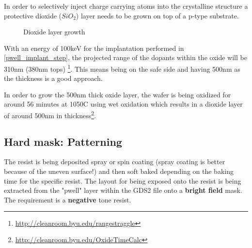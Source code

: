 In order to selectively inject charge carrying atoms into the crystalline structure a protective dioxide ($SiO_2$) layer needs to be grown on top of a p-type substrate.

\begin{figure}[H]
	\centering
	\begin{tikzpicture}[node distance = 3cm, auto, thick,scale=\CrossSectionOnly, every node/.style={transform shape}]
		
	\end{tikzpicture}
	\begin{tikzpicture}[node distance = 3cm, auto, thick,scale=\CrossSectionOnly, every node/.style={transform shape}]
		
	\end{tikzpicture}
	\caption{Dioxide layer growth}
\end{figure}

With an energy of 100keV for the implantation performed in \autoref{pwell_implant_step}, the projected range of the dopants within the oxide will be 310nm (380nm tops) \footnote{\url{http://cleanroom.byu.edu/rangestraggle}}.
This means being on the safe side and having 500nm as the thickness is a good approach.

In order to grow the 500nm thick oxide layer, the wafer is being oxidized for around 56 minutes at 1050\degree C using wet oxidation which results in a dioxide layer of around 500nm in thickness\footnote{\url{http://cleanroom.byu.edu/OxideTimeCalc}}.

\subsection{Hard mask: Patterning}

The resist is being deposited spray or spin coating (spray coating is better because of the uneven surface!) and then soft baked depending on the baking time for the specific resist.
The layout for being exposed onto the resist is being extracted from the "pwell" layer within the GDS2 file onto a \textbf{bright field} mask.
The requirement is a \textbf{negative} tone resist.

